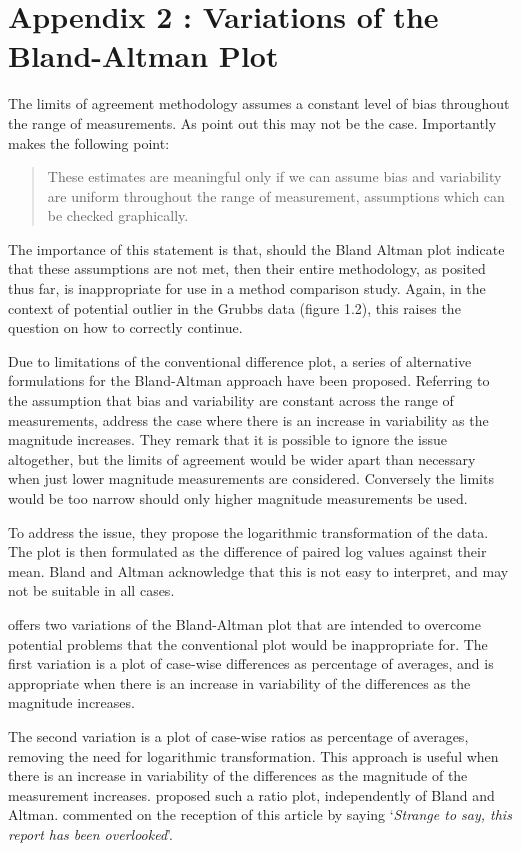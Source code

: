 \documentclass[12pt, a4paper]{report}
\theoremstyle{plain}
\theoremstyle{definition}
\theoremstyle{remark}
\begin{document}
\section{Appendix 2 : Variations of the Bland-Altman Plot} 
The limits of agreement methodology assumes a constant level of bias throughout the range of measurements. As \citet*{BA86} point out this may not be the case. 
Importantly \citet{BA99} makes the following point:
\begin{quote}These estimates are meaningful only if we can assume
	bias and variability are uniform throughout the range of
	measurement, assumptions which can be checked graphically.
	\end{quote}
	
	The importance of this statement is that, should the Bland Altman plot indicate that these assumptions are not met, then their
	entire methodology, as posited thus far, is inappropriate for use
	in a method comparison study. Again, in the context of potential
	outlier in the Grubbs data (figure 1.2), this raises the question
	on how to correctly continue. 
	
	Due to limitations of the conventional difference plot, a series of alternative formulations for the Bland-Altman approach have been proposed. Referring to the assumption that bias and variability are constant across the range of measurements, \citet{BA99} address the case where there is an increase in variability as the magnitude increases. They remark that it is possible to ignore the issue altogether, but the limits of agreement would be wider apart than necessary when just lower magnitude measurements are considered. Conversely the limits would be too narrow should only higher magnitude measurements be used. 
	
	To address the issue, they propose the logarithmic transformation of the data. The plot is then formulated as the difference of paired log values against their mean. Bland and Altman acknowledge that this is not easy to interpret, and may not be suitable in all cases.
	
	\citet{BA99} offers two variations of the Bland-Altman plot that are intended to overcome potential problems that the conventional plot would be inappropriate for. The first variation is a plot of case-wise differences as percentage of averages, and is appropriate when there is an increase in variability of the differences as the magnitude increases. 
	
	The second variation is a plot of case-wise ratios as percentage of averages, removing the need for logarithmic transformation. This approach is useful when there is an increase in variability of the differences as the magnitude of the measurement increases. \citet{Eksborg} proposed such a ratio plot, independently of Bland and Altman. \citet{Dewitte} commented on the reception of this article by saying `\textit{Strange to say, this report has been overlooked}'.
	
\end{document}

